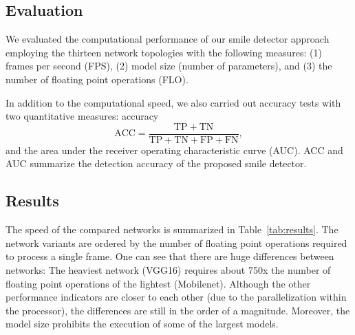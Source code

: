 \documentclass[conference]{IEEEtran}
\begin{document}
\subsection{Evaluation}

We evaluated the computational performance of our smile detector approach employing the thirteen network topologies with the following measures: (1) frames per second (FPS), (2) model size (number of parameters), and (3) the number of floating point operations (FLO). 
 
In addition to the computational speed, we also carried out  accuracy tests with  two quantitative measures: accuracy 
\[
\mathrm{ACC} = \frac{\mathrm{TP} + \mathrm{TN}}{\mathrm{TP} + \mathrm{TN} + \mathrm{FP} + \mathrm{FN}},
\]
and the area under the receiver operating characteristic curve (AUC). ACC and AUC summarize the detection accuracy of the proposed smile detector.%




\subsection{Results} 

The speed of the compared networks is summarized in Table~\ref{tab:results}. The network variants are ordered by the number of floating point operations required to process a single frame. One can see that there are huge differences between networks: The heaviest network (VGG16) requires about 750x the number of floating point operations of the lightest (Mobilenet). Although the other performance indicators are closer to each other (due to the parallelization within the processor), the differences are still in the order of a magnitude. Moreover, the model size prohibits the execution of some of the largest models.

\end{document}
